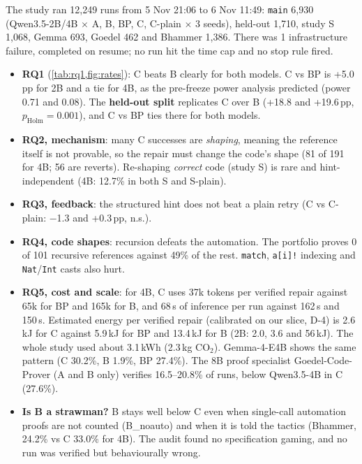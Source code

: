 \documentclass[10pt,twocolumn]{article}
\begin{document}
The study ran 12,249 runs from 5 Nov 21:06 to 6 Nov 11:49: \texttt{main} 6,930 (Qwen3.5-2B/4B $\times$ A, B, BP,
C, C-plain $\times$ 3 seeds), held-out 1,710, study S 1,068, Gemma 693, Goedel 462 and Bhammer 1,386. There was
1 infrastructure failure, completed on resume; no run hit the time cap and no stop rule fired.
\begin{itemize}
\item \textbf{RQ1} (\cref{tab:rq1,fig:rates}): C beats B clearly for both models. C vs BP is +5.0\,pp for 2B and a
tie for 4B, as the pre-freeze power analysis predicted (power 0.71 and 0.08). The \textbf{held-out split}
replicates C over B (+18.8 and +19.6\,pp, $p_\text{Holm}=0.001$), and C vs BP ties there for both models.
\item \textbf{RQ2, mechanism}: many C successes are \emph{shaping}, meaning the reference itself is not provable,
so the repair must change the code's shape (81 of 191 for 4B; 56 are reverts). Re-shaping \emph{correct} code
(study S) is rare and hint-independent (4B: 12.7\% in both S and S-plain).
\item \textbf{RQ3, feedback}: the structured hint does not beat a plain retry (C vs C-plain: $-$1.3 and
+0.3\,pp, n.s.).
\item \textbf{RQ4, code shapes}: recursion defeats the automation. The portfolio proves 0 of 101 recursive
references against 49\% of the rest. \texttt{match}, \texttt{a[i]!} indexing and \texttt{Nat}/\texttt{Int}
casts also hurt.
\item \textbf{RQ5, cost and scale}: for 4B, C uses 37k tokens per verified repair against 65k for BP and 165k
for B, and 68\,s of inference per run against 162\,s and 150\,s. Estimated energy per verified repair
(calibrated on our slice, D-4) is 2.6\,kJ for C against 5.9\,kJ for BP and 13.4\,kJ for B (2B: 2.0, 3.6 and
56\,kJ). The whole study used about 3.1\,kWh (2.3\,kg CO$_2$). Gemma-4-E4B shows the same pattern (C 30.2\%,
B 1.9\%, BP 27.4\%). The 8B proof specialist Goedel-Code-Prover (A and B only) verifies 16.5--20.8\% of runs,
below Qwen3.5-4B in C (27.6\%).
\item \textbf{Is B a strawman?} B stays well below C even when single-call automation proofs are not counted
(B\_noauto) and when it is told the tactics (Bhammer, 24.2\% vs C 33.0\% for 4B). The audit found no
specification gaming, and no run was verified but behaviourally wrong.
\end{itemize}
\end{document}
